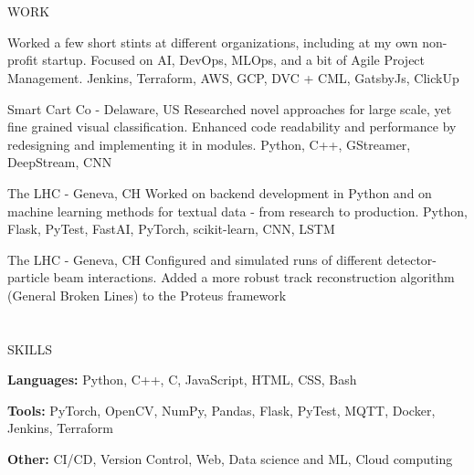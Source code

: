 \documentclass{my_cv}
\begin{document}
\begin{multicols}{2}
\section{\faPencil}{WORK}
    
%
    {}%
    {Worked a few short stints at different organizations, including at my own non-profit startup. Focused on AI, DevOps, MLOps, and a bit of Agile Project Management.}
    {Jenkins, Terraform, AWS, GCP, DVC + CML, GatsbyJs, ClickUp}

%
    {Smart Cart Co - Delaware, US}%
    {Researched novel approaches for large scale, yet fine grained visual classification. Enhanced code readability and performance by redesigning and implementing it in modules.}%
    {Python, C++, GStreamer, DeepStream, CNN}
     
%
    {The LHC - Geneva, CH}%
    {Worked on backend development in Python and on machine learning methods for textual data - from research to production.}%
    {Python, Flask, PyTest, FastAI, PyTorch, scikit-learn, CNN, LSTM}
    
%
    {The LHC - Geneva, CH}%
    {Configured and simulated runs of different detector-particle beam interactions. Added a more robust track reconstruction algorithm (General Broken Lines) to the Proteus framework}%
    {}
    
\section{\faList}{SKILLS}

\textbf{Languages:} Python, C++, C, JavaScript, HTML, CSS, Bash

\noindent\textbf{Tools:} PyTorch, OpenCV, NumPy, Pandas, Flask, PyTest, MQTT, Docker, Jenkins, Terraform

\noindent\textbf{Other:} CI/CD, Version Control, Web, Data science and ML, Cloud computing

\columnbreak


\end{multicols}
\end{document}
